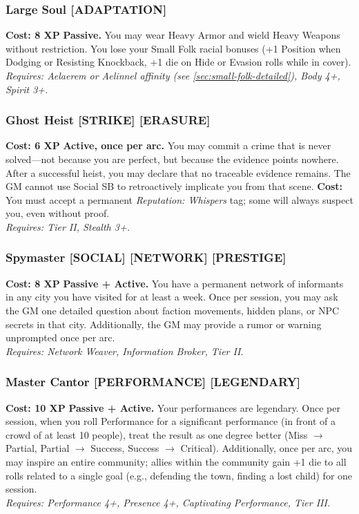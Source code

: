 \subsubsection*{Large Soul \textnormal{[ADAPTATION]}}
\label{talent:large-soul}
\textbf{Cost: 8 XP} \textbf{Passive.} You may wear Heavy Armor and wield Heavy Weapons without restriction. You lose your Small Folk racial bonuses (+1 Position when Dodging or Resisting Knockback, +1 die on Hide or Evasion rolls while in cover). \\
\textit{Requires: Aelaerem or Aelinnel affinity (see \ref{sec:small-folk-detailed}), Body 4+, Spirit 3+.}

\subsubsection*{Ghost Heist \textnormal{[STRIKE] [ERASURE]}}
\label{talent:ghost-heist}
\textbf{Cost: 6 XP} \textbf{Active, once per arc.} You may commit a crime that is never solved---not because you are perfect, but because the evidence points nowhere. After a successful heist, you may declare that no traceable evidence remains. The GM cannot use Social SB to retroactively implicate you from that scene. \textbf{Cost:} You must accept a permanent \textit{Reputation: Whispers} tag; some will always suspect you, even without proof. \\
\textit{Requires: Tier II, Stealth 3+.}

\subsubsection*{Spymaster \textnormal{[SOCIAL] [NETWORK] [PRESTIGE]}}
\label{talent:spymaster}
\textbf{Cost: 8 XP} \textbf{Passive + Active.} You have a permanent network of informants in any city you have visited for at least a week. Once per session, you may ask the GM one detailed question about faction movements, hidden plans, or NPC secrets in that city. Additionally, the GM may provide a rumor or warning unprompted once per arc. \\
\textit{Requires: Network Weaver, Information Broker, Tier II.}

\subsubsection*{Master Cantor \textnormal{[PERFORMANCE] [LEGENDARY]}}
\label{talent:master-cantor}
\textbf{Cost: 10 XP} \textbf{Passive + Active.} Your performances are legendary. Once per session, when you roll Performance for a significant performance (in front of a crowd of at least 10 people), treat the result as one degree better (Miss $\rightarrow$ Partial, Partial $\rightarrow$ Success, Success $\rightarrow$ Critical). Additionally, once per arc, you may inspire an entire community; allies within the community gain +1 die to all rolls related to a single goal (e.g., defending the town, finding a lost child) for one session. \\
\textit{Requires: Performance 4+, Presence 4+, Captivating Performance, Tier III.}

